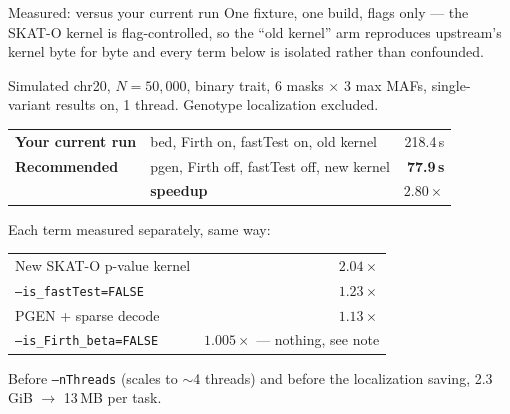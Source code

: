 \documentclass[aspectratio=169,11pt]{beamer}
\newcommand{\win}[1]{\textcolor{good}{\textbf{#1}}}
\begin{document}
\begin{frame}{Measured: versus your current run}
One fixture, one build, flags only --- the SKAT-O kernel is flag-controlled, so
the ``old kernel'' arm reproduces upstream's kernel byte for byte and every term
below is isolated rather than confounded.

\medskip
{\footnotesize Simulated chr20, $N=50{,}000$, binary trait, 6 masks $\times$ 3 max MAFs,
single-variant results on, 1 thread. Genotype localization excluded.}

\medskip
\begin{center}\small
\begin{tabular}{llr}
\toprule
\textbf{Your current run} & bed, Firth on, fastTest on, old kernel & 218.4\,s \\
\textbf{Recommended} & pgen, Firth off, fastTest off, new kernel & \win{77.9\,s} \\
\midrule
 & \textbf{speedup} & \win{$\mathbf{2.80\times}$} \\
\bottomrule
\end{tabular}
\end{center}

\medskip
Each term measured separately, same way:

\medskip
\begin{center}\small
\begin{tabular}{lr}
\toprule
New SKAT-O p-value kernel & \win{$2.04\times$} \\
\texttt{--is\_fastTest=FALSE} & \win{$1.23\times$} \\
PGEN + sparse decode & \win{$1.13\times$} \\
\texttt{--is\_Firth\_beta=FALSE} & $1.005\times$ {\footnotesize --- nothing, see note} \\
\bottomrule
\end{tabular}
\end{center}

\medskip
Before \texttt{--nThreads} (scales to $\sim$4 threads) and before the
localization saving, 2.3\,GiB $\to$ 13\,MB per task.
\end{frame}
\end{document}
